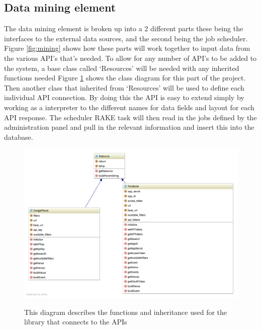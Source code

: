		\subsection{Data mining element}
			The data mining element is broken up into a 2 different parts these being the interfaces to the external data sources, and the second being the job scheduler. Figure \ref{fig:mining} shows how these parts will work together to input data from the various API's that's needed. To allow for any number of API's to be added to the system, a base class called `Resources' will be needed with any inherited functions needed Figure \ref{fig:class_api} shows the class diagram for this part of the project. Then another class that inherited from `Resources' will be used to define each individual API connection. By doing this the API is easy to extend simply by working as a interpreter to the different names for data fields and layout for each API response. The scheduler RAKE  task will then read in the jobs defined by the administration panel and pull in the relevant information and insert this into the database.

			\begin{figure}[ht] %
				\caption[Class Diagram for API integration ]{This diagram describes the functions and inheritance used for the library that connects to the APIs}
				\centering
				\includegraphics[width=1\textwidth]{Images/resources}
				\label{fig:class_api}
			\end{figure}

